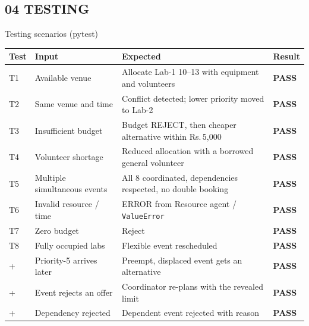 \documentclass[aspectratio=169,11pt]{beamer}
\newcommand{\rs}{Rs.\,}
\begin{document}
\subsection{04 \textbullet{} TESTING}
\begin{frame}{Testing scenarios (pytest)}
  \scriptsize
  \begin{tabularx}{\textwidth}{@{}l l X l@{}}
    \toprule
    \textbf{Test} & \textbf{Input} & \textbf{Expected} & \textbf{Result} \\
    \midrule
    T1 & Available venue            & Allocate Lab-1 10--13 with equipment and volunteers         & \textcolor{resc}{\textbf{PASS}} \\
    T2 & Same venue and time        & Conflict detected; lower priority moved to Lab-2              & \textcolor{resc}{\textbf{PASS}} \\
    T3 & Insufficient budget        & Budget REJECT, then cheaper alternative within \rs 5{,}000    & \textcolor{resc}{\textbf{PASS}} \\
    T4 & Volunteer shortage         & Reduced allocation with a borrowed general volunteer          & \textcolor{resc}{\textbf{PASS}} \\
    T5 & Multiple simultaneous events & All 8 coordinated, dependencies respected, no double booking & \textcolor{resc}{\textbf{PASS}} \\
    T6 & Invalid resource / time    & ERROR from Resource agent / \texttt{ValueError}               & \textcolor{resc}{\textbf{PASS}} \\
    T7 & Zero budget                & Reject                                                        & \textcolor{resc}{\textbf{PASS}} \\
    T8 & Fully occupied labs        & Flexible event rescheduled                                    & \textcolor{resc}{\textbf{PASS}} \\
    +  & Priority-5 arrives later   & Preempt, displaced event gets an alternative                  & \textcolor{resc}{\textbf{PASS}} \\
    +  & Event rejects an offer     & Coordinator re-plans with the revealed limit                  & \textcolor{resc}{\textbf{PASS}} \\
    +  & Dependency rejected        & Dependent event rejected with reason                          & \textcolor{resc}{\textbf{PASS}} \\
    \bottomrule
  \end{tabularx}
\end{frame}
\end{document}
